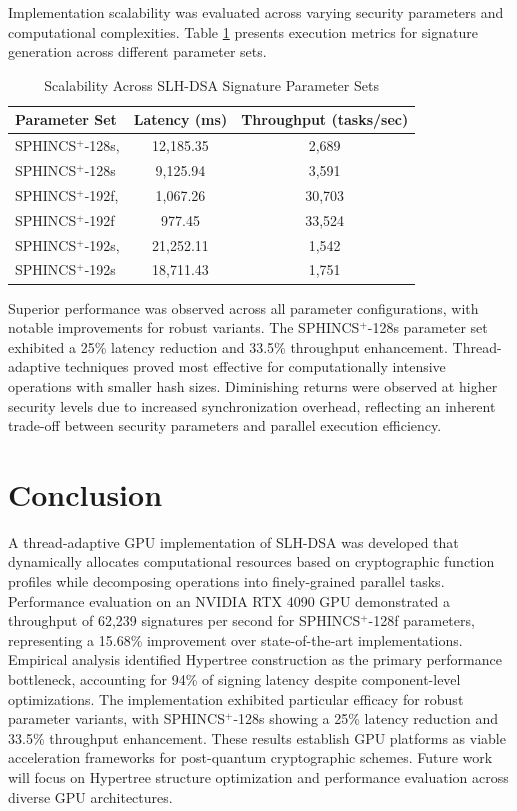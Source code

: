 \documentclass[journal]{IEEEtran}
\begin{document}
Implementation scalability was evaluated across varying security parameters and computational complexities. Table \ref{tab:scalability} presents execution metrics for signature generation across different parameter sets.

\begin{table}[h]
  \centering
  \caption{Scalability Across SLH-DSA Signature Parameter Sets}
  \label{tab:scalability}
  \begin{tabular}{@{}lcc@{}}
    \toprule
    \textbf{Parameter Set} & \textbf{Latency (ms)} & \textbf{Throughput (tasks/sec)} \\
    \midrule
    SPHINCS$^+$-128s, \cite{Wang2025} & 12,185.35 & 2,689 \\
    SPHINCS$^+$-128s & 9,125.94 & 3,591 \\
    \midrule
    SPHINCS$^+$-192f, \cite{Wang2025} & 1,067.26 & 30,703 \\
    SPHINCS$^+$-192f & 977.45 & 33,524 \\
    \midrule
    SPHINCS$^+$-192s, \cite{Wang2025} & 21,252.11 & 1,542 \\
    SPHINCS$^+$-192s & 18,711.43 & 1,751 \\
    \bottomrule
  \end{tabular}
\end{table}

Superior performance was observed across all parameter configurations, with notable improvements for robust variants. The SPHINCS$^+$-128s parameter set exhibited a 25\% latency reduction and 33.5\% throughput enhancement. Thread-adaptive techniques proved most effective for computationally intensive operations with smaller hash sizes. Diminishing returns were observed at higher security levels due to increased synchronization overhead, reflecting an inherent trade-off between security parameters and parallel execution efficiency.

\section{Conclusion}\label{sec:conclusion}

A thread-adaptive GPU implementation of SLH-DSA was developed that dynamically allocates computational resources based on cryptographic function profiles while decomposing operations into finely-grained parallel tasks. Performance evaluation on an NVIDIA RTX 4090 GPU demonstrated a throughput of 62,239 signatures per second for SPHINCS$^+$-128f parameters, representing a 15.68\% improvement over state-of-the-art implementations. Empirical analysis identified Hypertree construction as the primary performance bottleneck, accounting for 94\% of signing latency despite component-level optimizations. The implementation exhibited particular efficacy for robust parameter variants, with SPHINCS$^+$-128s showing a 25\% latency reduction and 33.5\% throughput enhancement. These results establish GPU platforms as viable acceleration frameworks for post-quantum cryptographic schemes. Future work will focus on Hypertree structure optimization and performance evaluation across diverse GPU architectures.
\end{document}
